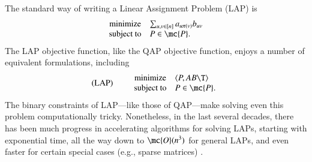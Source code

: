 \documentclass[preprint,11pt]{elsarticle}
\begin{document}
The standard way of writing a Linear Assignment Problem (LAP) is
\begin{equation*}
\begin{array}{cl}
			\text{minimize}   & \sum_{u,v \in [n]} a_{u \pi(v)} b_{uv} \\
			\text{subject to}  &P \in \mc{P}.   
\end{array} %
\end{equation*}
The LAP objective function, like the QAP objective function, enjoys a number of equivalent formulations, including
% 
% 
\begin{equation}
\text{(LAP)} \qquad  
\begin{array}{cl}
			\text{minimize}   & \langle P, AB\T \rangle \\
			\text{subject to}  &P \in \mc{P}.   
\end{array}\label{eq:LAP}
\end{equation}
% 
The binary constraints of LAP---like those of QAP---make solving even this problem computationally tricky.  Nonetheless, in the last several decades, there has been much progress in accelerating algorithms for solving LAPs, starting with exponential time, all the way down to $\mc{O}(n^3)$ for general LAPs, and even faster for certain special cases (e.g., sparse matrices) \cite{Jonker1987, Burkard2009}.
\end{document}
